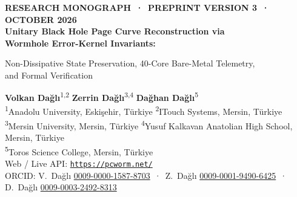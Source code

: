 \documentclass[11pt,a4paper]{article}
\begin{document}
\thispagestyle{first}

\begin{center}
{\small\bfseries\color{accentblue} RESEARCH MONOGRAPH \,·\, PREPRINT VERSION 3 \,·\, OCTOBER 2026}\\[1.4ex]
{\LARGE\bfseries Unitary Black Hole Page Curve Reconstruction via\\[0.3ex] Wormhole Error-Kernel Invariants:\\[0.5ex]}
{\Large Non-Dissipative State Preservation, 40-Core Bare-Metal Telemetry,\\[0.3ex] and Formal Verification\par}
\vspace{2.0ex}
{\large \textbf{Volkan Dağlı}\textsuperscript{1,2} \quad \textbf{Zerrin Dağlı}\textsuperscript{3,4} \quad \textbf{Dağhan Dağlı}\textsuperscript{5}}\\[1.2ex]
{\small
\textsuperscript{1}Anadolu University, Eskişehir, Türkiye \quad
\textsuperscript{2}ITouch Systems, Mersin, Türkiye\\
\textsuperscript{3}Mersin University, Mersin, Türkiye \quad
\textsuperscript{4}Yusuf Kalkavan Anatolian High School, Mersin, Türkiye\\
\textsuperscript{5}Toros Science College, Mersin, Türkiye\\[0.8ex]
Web / Live API: \href{https://pcworm.net/}{\texttt{https://pcworm.net/}}\\[0.5ex]
ORCID: V.~Dağlı \href{https://orcid.org/0009-0000-1587-8703}{0009-0000-1587-8703} \,·\, Z.~Dağlı \href{https://orcid.org/0009-0001-9490-6425}{0009-0001-9490-6425} \,·\, D.~Dağlı \href{https://orcid.org/0009-0003-2492-8313}{0009-0003-2492-8313}}
\end{center}
\end{document}
